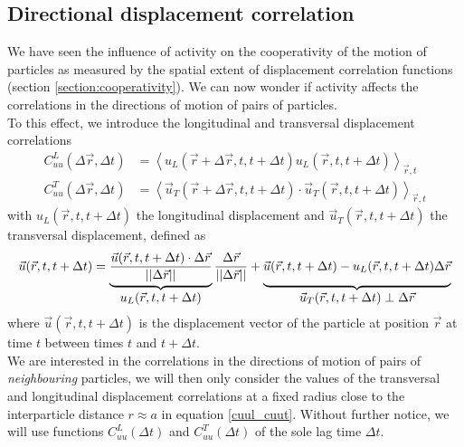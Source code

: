 \documentclass[class=report, float=false, crop=false]{standalone}
\begin{document}
\subsection{Directional displacement correlation}


We have seen the influence of activity on the cooperativity of the motion of particles as measured by the spatial extent of displacement correlation functions (section \ref{section:cooperativity}). We can now wonder if activity affects the correlations in the directions of motion of pairs of particles.\\

To this effect, we introduce the longitudinal and transversal displacement correlations \cite{weeks2007short, vasisht2018rate}
\begin{equation}
\begin{aligned}
C_{uu}^L(\Delta\vec{r}, \Delta t) &= \left<u_L(\vec{r} + \Delta \vec{r}, t, t + \Delta t)u_L(\vec{r}, t, t + \Delta t)\right>_{\vec{r}, t}\\
C_{uu}^T(\Delta\vec{r}, \Delta t) &= \left<\vec{u}_T(\vec{r} + \Delta \vec{r}, t, t + \Delta t)\cdot\vec{u}_T(\vec{r}, t, t + \Delta t)\right>_{\vec{r}, t}
\end{aligned}
\label{cuul_cuut}
\end{equation}
with $u_L(\vec{r}, t, t + \Delta t)$ the longitudinal displacement and $\vec{u}_T(\vec{r}, t, t + \Delta t)$ the transversal displacement, defined as
\begin{equation}
\vec{u}(\vec{r}, t, t + \Delta t) = \underbrace{\frac{\vec{u}(\vec{r}, t, t + \Delta t)\cdot\Delta\vec{r}}{||\Delta\vec{r}||}}_{\displaystyle u_L(\vec{r}, t, t + \Delta t)}\frac{\Delta\vec{r}}{||\Delta\vec{r}||} + \underbrace{\vphantom{\frac{\vec{u}(\vec{r}, t, t + \Delta t)\cdot\Delta\vec{r}}{||\Delta\vec{r}||}}\vec{u}(\vec{r}, t, t + \Delta t) - u_L(\vec{r}, t, t + \Delta t)\Delta\vec{r}}_{\displaystyle\vec{u}_T(\vec{r}, t, t + \Delta t)\perp\Delta\vec{r}}
\end{equation}
where $\vec{u}(\vec{r}, t, t + \Delta t)$ is the displacement vector of the particle at position $\vec{r}$ at time $t$ between times $t$ and $t + \Delta t$.\\

We are interested in the correlations in the directions of motion of pairs of \textit{neighbouring} particles, we will then only consider the values of the transversal and longitudinal displacement correlations at a fixed radius close to the interparticle distance $r \approx a$ in equation \ref{cuul_cuut}. Without further notice, we will use functions $C_{uu}^L(\Delta t)$ and $C_{uu}^T(\Delta t)$ of the sole lag time $\Delta t$.
\end{document}
